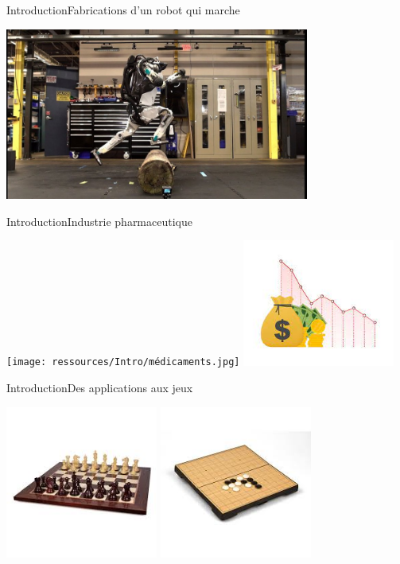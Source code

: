 \begin{frame}{Introduction}{Fabrications d'un robot qui marche}
   	\begin{center}
   		\includegraphics[width=10cm]{ressources/Intro/Robot saut.jpg}
   	\end{center}
\end{frame}
\begin{frame}{Introduction}{Industrie pharmaceutique}
	\begin{center}
		\texttt{[image: ressources/Intro/médicaments.jpg]}
		\includegraphics[width=5cm]{ressources/Intro/prix.jpg}
	\end{center}
\end{frame}
\begin{frame}{Introduction}{Des applications aux jeux}
	\begin{center}
		\includegraphics[width=5cm]{ressources/Intro/Echecs.jpg}
		\includegraphics[width=5cm]{ressources/Intro/GO.jpg}
	\end{center}
\end{frame}